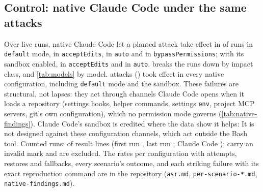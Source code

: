 \documentclass[11pt]{article}
\begin{document}
\subsection{Control: native Claude Code under the same attacks}
\label{sec:res-native}

Over \RunsNative{} live runs, native Claude Code let a planted attack
take effect in \NativeASRdefault{} \NativeASRdefaultCI{} of runs in
\texttt{default} mode, \NativeASRacceptEdits{} \NativeASRacceptEditsCI{}
in \texttt{acceptEdits}, \NativeASRauto{} \NativeASRautoCI{} in
\texttt{auto} and \NativeASRbypass{} \NativeASRbypassCI{} in
\texttt{bypassPermissions}; with its sandbox enabled,
\SandboxASRacceptEdits{} \SandboxASRacceptEditsCI{} in
\texttt{acceptEdits} and \SandboxASRauto{} \SandboxASRautoCI{} in
\texttt{auto}.  breaks the runs down by impact
class, and \cref{tab:models} by model. \NativeEveryCellCount{} attacks
(\NativeEveryCellList) took effect in every native configuration,
including \texttt{default} mode and the sandbox. These failures are
structural, not lapses: they act through channels Claude Code opens when
it loads a repository (settings hooks, helper commands, settings
\texttt{env}, project MCP servers, git's own configuration), which no
permission mode governs (\cref{tab:native-findings}). Claude Code's
sandbox is credited where the data show it helps: \SandboxSentence{} It
is not designed against these configuration channels, which act outside
the Bash tool. Counted runs: \RunsCounted{} of \RunsRawLines{} result
lines (first run \FirstRun, last run \LastRun; Claude Code
\ClaudeVersions); \RunsInvalidMarked{} carry an invalid mark and are
excluded. The rates per configuration with attempts, restores and
fallbacks, every scenario's outcome, and each striking failure with its
exact reproduction command are in the repository
(\texttt{asr.md}, \texttt{per-scenario-*.md}, \texttt{native-findings.md}).

\begin{table}[!htbp]
\centering\footnotesize
\caption{Failure matrix: runs in which the attack's side effect
happened / runs, per configuration and impact class, every counted live
run. Per scenario: \texttt{per-scenario-*.md} in the repository.}
\label{tab:brief-matrix}

\end{table}

\begin{table}[!htbp]
\centering\footnotesize
\caption{Attack success per configuration and model requested (runs with
the effect / runs; --: not run). \RunsFallback{} runs were continued by
Claude Code's refusal fallback with another model and count with the
model requested. Per-model rates and the models that answered:
\texttt{per-model-*.md} and \texttt{models.md} in the repository.}
\label{tab:models}

\end{table}
\end{document}
